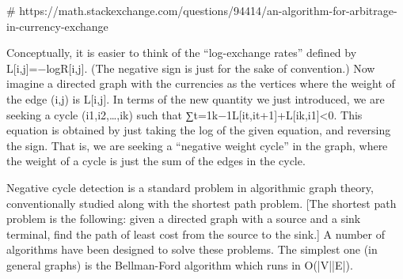 # https://math.stackexchange.com/questions/94414/an-algorithm-for-arbitrage-in-currency-exchange

Conceptually, it is easier to think of the “log-exchange rates” defined by L[i,j]=−logR[i,j]. (The negative sign is just for the sake of convention.) Now imagine a directed graph with the currencies as the vertices where the weight of the edge (i,j) is L[i,j]. In terms of the new quantity we just introduced, we are seeking a cycle (i1,i2,…,ik) such that
∑t=1k−1L[it,it+1]+L[ik,i1]<0.
This equation is obtained by just taking the log of the given equation, and reversing the sign. That is, we are seeking a “negative weight cycle” in the graph, where the weight of a cycle is just the sum of the edges in the cycle.

Negative cycle detection is a standard problem in algorithmic graph theory, conventionally studied along with the shortest path problem. [The shortest path problem is the following: given a directed graph with a source and a sink terminal, find the path of least cost from the source to the sink.] A number of algorithms have been designed to solve these problems. The simplest one (in general graphs) is the Bellman-Ford algorithm which runs in O(|V||E|).
